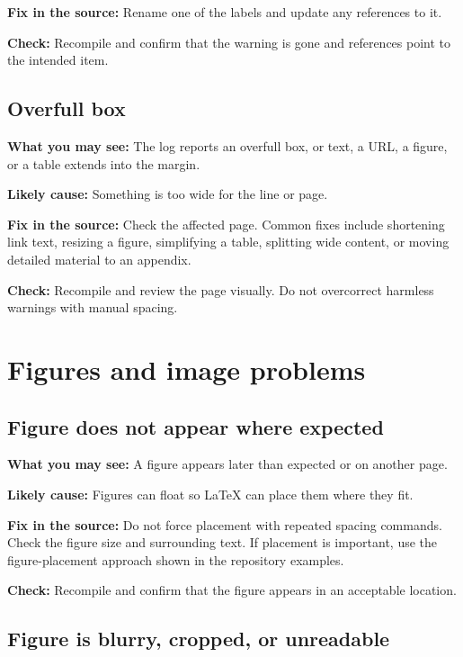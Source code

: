 \textbf{Fix in the source:} Rename one of the labels and update any references to it.

\textbf{Check:} Recompile and confirm that the warning is gone and references point to the intended item.

\subsection{Overfull box}
\label{subsec:overfull-box}

\textbf{What you may see:} The log reports an overfull box, or text, a URL, a figure, or a table extends into the margin.

\textbf{Likely cause:} Something is too wide for the line or page.

\textbf{Fix in the source:} Check the affected page. Common fixes include shortening link text, resizing a figure, simplifying a table, splitting wide content, or moving detailed material to an appendix.

\textbf{Check:} Recompile and review the page visually. Do not overcorrect harmless warnings with manual spacing.

\section{Figures and image problems}
\label{sec:figure-image-problems}

\subsection{Figure does not appear where expected}
\label{subsec:figure-not-where-expected}

\textbf{What you may see:} A figure appears later than expected or on another page.

\textbf{Likely cause:} Figures can float so \LaTeX{} can place them where they fit.

\textbf{Fix in the source:} Do not force placement with repeated spacing commands. Check the figure size and surrounding text. If placement is important, use the figure-placement approach shown in the repository examples.

\textbf{Check:} Recompile and confirm that the figure appears in an acceptable location.

\subsection{Figure is blurry, cropped, or unreadable}
\label{subsec:figure-blurry-cropped-unreadable}


